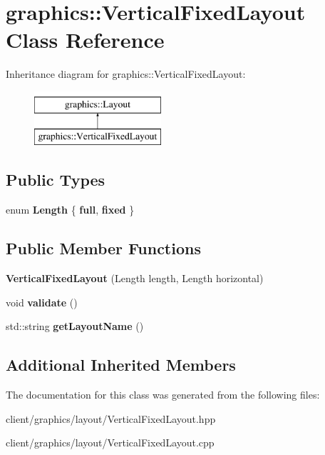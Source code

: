 \hypertarget{classgraphics_1_1_vertical_fixed_layout}{\section{graphics\-:\-:Vertical\-Fixed\-Layout Class Reference}
\label{classgraphics_1_1_vertical_fixed_layout}
}
Inheritance diagram for graphics\-:\-:Vertical\-Fixed\-Layout\-:\begin{figure}[H]
\begin{center}
\leavevmode
\includegraphics[height=2.000000cm]{classgraphics_1_1_vertical_fixed_layout}
\end{center}
\end{figure}
\subsection*{Public Types}
\begin{DoxyCompactItemize}
\item 
enum {\bfseries Length} \{ {\bfseries full}, 
{\bfseries fixed}
 \}
\end{DoxyCompactItemize}
\subsection*{Public Member Functions}
\begin{DoxyCompactItemize}
\item 
\hypertarget{classgraphics_1_1_vertical_fixed_layout_abe8adf8675257964d3050ff984ba6121}{{\bfseries Vertical\-Fixed\-Layout} (Length length, Length horizontal)}\label{classgraphics_1_1_vertical_fixed_layout_abe8adf8675257964d3050ff984ba6121}

\item 
\hypertarget{classgraphics_1_1_vertical_fixed_layout_a3f5092e8646a59d13c8805c9dd2a3829}{void {\bfseries validate} ()}\label{classgraphics_1_1_vertical_fixed_layout_a3f5092e8646a59d13c8805c9dd2a3829}

\item 
\hypertarget{classgraphics_1_1_vertical_fixed_layout_ab1954dffe9262154ac2d3f7fa886652e}{std\-::string {\bfseries get\-Layout\-Name} ()}\label{classgraphics_1_1_vertical_fixed_layout_ab1954dffe9262154ac2d3f7fa886652e}

\end{DoxyCompactItemize}
\subsection*{Additional Inherited Members}


The documentation for this class was generated from the following files\-:\begin{DoxyCompactItemize}
\item 
client/graphics/layout/Vertical\-Fixed\-Layout.\-hpp\item 
client/graphics/layout/Vertical\-Fixed\-Layout.\-cpp\end{DoxyCompactItemize}
